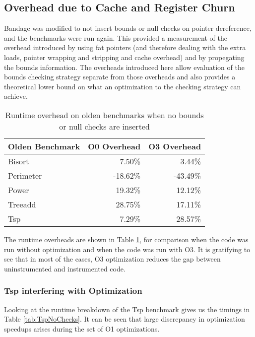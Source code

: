 \subsection{Overhead due to Cache and Register Churn}

Bandage was modified to not insert bounds or null checks on pointer dereference, and the benchmarks were run again.
This provided a measurement of the overhead introduced by using fat pointers (and therefore dealing with the extra loads, pointer wrapping and stripping and cache overhead) and by propegating the bounds information.
The overheads introduced here allow evaluation of the bounds checking strategy separate from those overheads and also provides a theoretical lower bound on what an optimization to the checking strategy can achieve.

\begin{table}
\centering
\begin{tabular}{|l|r|r|}
\hline \textbf{Olden Benchmark} & \textbf{O0 Overhead} & \textbf{O3 Overhead}\\
\hline Bisort       &   7.50\%   &   3.44\% \\
\hline Perimeter    & -18.62\%   & -43.49\% \\
\hline Power        &  19.32\%   &  12.12\% \\
\hline Treeadd      &  28.75\%   &  17.11\% \\
\hline Tsp          &   7.29\%   &  28.57\% \\
\hline
\end{tabular}
\caption{Runtime overhead on olden benchmarks when no bounds or null checks are inserted}
\label{tab:NoChecks}
\end{table}

The runtime overheads are shown in Table \ref{tab:NoChecks}, for comparison when the code was run without optimization and when the code was run with O3.
It is gratifying to see that in most of the cases, O3 optimization reduces the gap between uninstrumented and instrumented code.

\subsubsection{Tsp interfering with Optimization}

Looking at the runtime breakdown of the Tsp benchmark gives us the timings in Table \ref{tab:TspNoChecks}.
It can be seen that large discrepancy in optimization speedups arises during the set of O1 optimizations.


